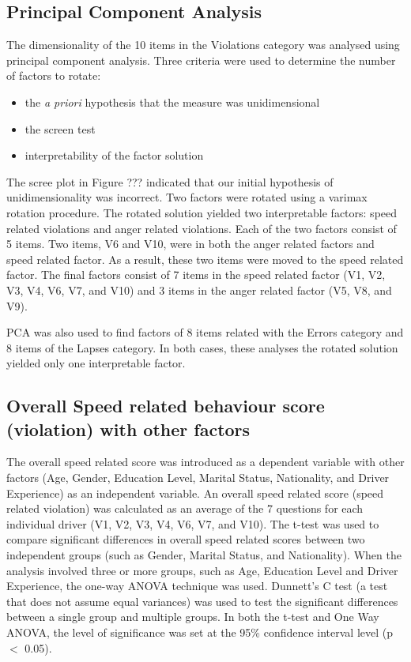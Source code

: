 \documentclass[preprint,12pt,a4paper,authoryear]{elsarticle}
\begin{document}
\begin{linenumbers}
\subsection{Principal Component Analysis}
The dimensionality of the 10 items in the Violations category was analysed using principal component analysis.  Three criteria were used to determine the number of factors to rotate:
\begin{itemize}
\item{the \textit{a priori} hypothesis that the measure was unidimensional}
\item{the screen test}
\item{interpretability of the factor solution}
\end{itemize}

The scree plot in Figure ??? indicated that our initial hypothesis of unidimensionality was incorrect. Two factors were rotated using a varimax rotation procedure. The rotated solution yielded two interpretable factors: speed related violations and anger related violations. Each of the two factors consist of 5 items. Two items, V6 and V10, were in both the anger related factors and speed related factor. As a result, these two items were moved to the speed related factor. The final factors consist of 7 items in the speed related factor (V1, V2, V3, V4, V6, V7, and V10)  and 3 items in the anger related factor (V5, V8, and V9). 

PCA was also used to find factors of 8 items related with the Errors category and 8 items of the Lapses category. In both cases, these analyses the rotated solution yielded only one interpretable factor.

\subsection{Overall Speed related behaviour score (violation) with other factors}

The overall speed related score was introduced as a dependent variable with other factors (Age, Gender, Education Level, Marital Status, Nationality, and Driver Experience) as an independent variable. An overall speed related score (speed related violation) was calculated as an average of the 7 questions for each individual driver (V1, V2, V3, V4, V6, V7, and V10). The t-test was used to compare significant differences in overall speed related scores between two independent groups (such as Gender, Marital Status, and Nationality). When the analysis involved three or more groups, such as Age, Education Level and Driver Experience, the one-way ANOVA technique was used. Dunnett's C test (a test that does not assume equal variances) was used to test the significant differences between a single group and multiple groups. In both the t-test and One Way ANOVA, the level of significance was set at the 95\% confidence interval level (p$<$ 0.05). 


\end{linenumbers}
\end{document}
